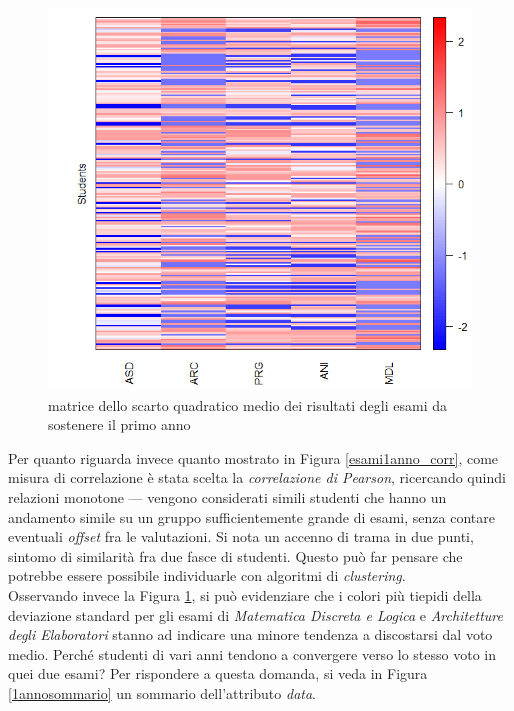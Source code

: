                 \begin{figure}
                    \centering
                    \caption{matrice dello scarto quadratico medio dei risultati degli esami da sostenere il primo anno}
                    \label{esami1anno_stddev}
                	\includegraphics[scale=0.80]{img/std_dev_matrix_1.png}
                \end{figure}

                Per quanto riguarda invece quanto mostrato in Figura \ref{esami1anno_corr}, come misura di correlazione è stata scelta la \textit{correlazione di Pearson}, ricercando quindi relazioni monotone --- vengono considerati simili studenti che hanno un andamento simile su un gruppo sufficientemente grande di esami, senza contare eventuali \textit{offset} fra le valutazioni. Si nota un accenno di trama in due punti, sintomo di similarità fra due fasce di studenti. Questo può far pensare che potrebbe essere possibile individuarle con algoritmi di \textit{clustering}. \\

                Osservando invece la Figura \ref{esami1anno_stddev}, si può evidenziare che i colori più tiepidi della deviazione standard per gli esami di \textit{Matematica Discreta e Logica} e \textit{Architetture degli Elaboratori} stanno ad indicare una minore tendenza a discostarsi dal voto medio. Perché studenti di vari anni tendono a convergere verso lo stesso voto in quei due esami? Per rispondere a questa domanda, si veda in Figura \ref{1annosommario} un sommario dell'attributo \textit{data}. \\

